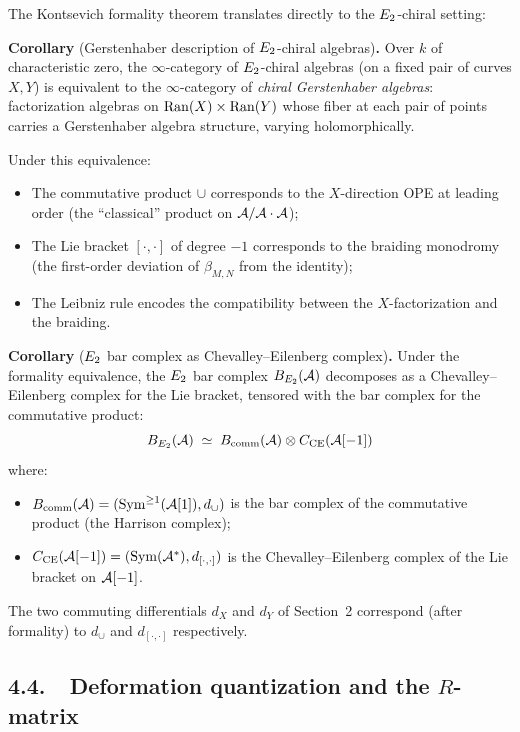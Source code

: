 The Kontsevich formality theorem translates directly to the
$E_2$-chiral setting:

\medskip
\noindent\textbf{Corollary} (Gerstenhaber description of $E_2$-chiral
algebras)\textbf{.}\;
Over $k$ of characteristic zero, the $\infty$-category of
$E_2$-chiral algebras (on a fixed pair of curves $X, Y$) is
equivalent to the $\infty$-category of \emph{chiral Gerstenhaber
algebras}: factorization algebras on $\mathrm{Ran}(X) \times \mathrm{Ran}(Y)$ whose
fiber at each pair of points carries a Gerstenhaber algebra structure,
varying holomorphically.

Under this equivalence:
\begin{itemize}
 \item The commutative product $\cup$ corresponds to the
 $X$-direction OPE at leading order (the ``classical'' product
 on $\mathcal{A}/\mathcal{A} \cdot \mathcal{A}$);
 \item The Lie bracket $[\cdot, \cdot]$ of degree $-1$ corresponds to
 the braiding monodromy (the first-order deviation of
 $\beta_{M,N}$ from the identity);
 \item The Leibniz rule encodes the compatibility between the
 $X$-factorization and the braiding.
\end{itemize}

\medskip
\noindent\textbf{Corollary} ($E_2$ bar complex as Chevalley--Eilenberg
complex)\textbf{.}\;
Under the formality equivalence, the $E_2$ bar complex
$B_{E_2}(\mathcal{A})$ decomposes as a Chevalley--Eilenberg complex for the
Lie bracket, tensored with the bar complex for the commutative product:
\begin{equation}\label{eq:be2-ce}
 B_{E_2}(\mathcal{A})
 \;\simeq\;
 B_{\mathrm{comm}}(\mathcal{A}) \otimes C_{\mathrm{CE}}(\mathcal{A}[-1])
\end{equation}
where:
\begin{itemize}
 \item $B_{\mathrm{comm}}(\mathcal{A}) = (\mathrm{Sym}^{\geq 1}(\mathcal{A}[1]), d_\cup)$
 is the bar complex of the commutative product (the Harrison complex);
 \item $C_{\mathrm{CE}}(\mathcal{A}[-1])
 = (\mathrm{Sym}(\mathcal{A}^*), d_{[\cdot,\cdot]})$ is the Chevalley--Eilenberg
 complex of the Lie bracket on $\mathcal{A}[-1]$.
\end{itemize}
The two commuting differentials $d_X$ and $d_Y$ of Section~2 correspond
(after formality) to $d_\cup$ and $d_{[\cdot,\cdot]}$ respectively.

\subsection*{4.4.\ \ Deformation quantization and the $R$-matrix}

